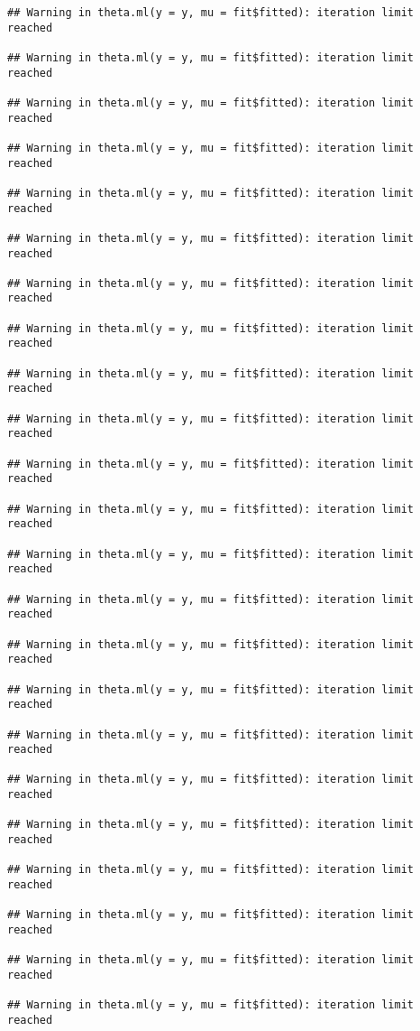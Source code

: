 \documentclass[
]{article}
\begin{document}
\begin{verbatim}
## Warning in theta.ml(y = y, mu = fit$fitted): iteration limit reached

## Warning in theta.ml(y = y, mu = fit$fitted): iteration limit reached

## Warning in theta.ml(y = y, mu = fit$fitted): iteration limit reached

## Warning in theta.ml(y = y, mu = fit$fitted): iteration limit reached

## Warning in theta.ml(y = y, mu = fit$fitted): iteration limit reached

## Warning in theta.ml(y = y, mu = fit$fitted): iteration limit reached

## Warning in theta.ml(y = y, mu = fit$fitted): iteration limit reached

## Warning in theta.ml(y = y, mu = fit$fitted): iteration limit reached

## Warning in theta.ml(y = y, mu = fit$fitted): iteration limit reached

## Warning in theta.ml(y = y, mu = fit$fitted): iteration limit reached

## Warning in theta.ml(y = y, mu = fit$fitted): iteration limit reached

## Warning in theta.ml(y = y, mu = fit$fitted): iteration limit reached

## Warning in theta.ml(y = y, mu = fit$fitted): iteration limit reached

## Warning in theta.ml(y = y, mu = fit$fitted): iteration limit reached

## Warning in theta.ml(y = y, mu = fit$fitted): iteration limit reached

## Warning in theta.ml(y = y, mu = fit$fitted): iteration limit reached

## Warning in theta.ml(y = y, mu = fit$fitted): iteration limit reached

## Warning in theta.ml(y = y, mu = fit$fitted): iteration limit reached

## Warning in theta.ml(y = y, mu = fit$fitted): iteration limit reached

## Warning in theta.ml(y = y, mu = fit$fitted): iteration limit reached

## Warning in theta.ml(y = y, mu = fit$fitted): iteration limit reached

## Warning in theta.ml(y = y, mu = fit$fitted): iteration limit reached

## Warning in theta.ml(y = y, mu = fit$fitted): iteration limit reached


\end{verbatim}
\end{document}
